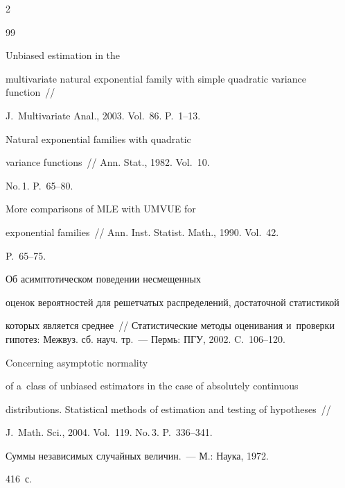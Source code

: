 \begin{multicols}{2}
{{\begin{thebibliography}{99}




 Unbiased estimation in the


  multivariate natural exponential family with simple quadratic variance function~// 


  J.~Multivariate Anal., 2003. Vol.~86. P.~1--13.






 Natural exponential families with quadratic


 variance functions~// Ann. Stat., 1982. Vol.~10.


 No.\,1.  P.~65--80.






 More comparisons of MLE with UMVUE for


 exponential families~// Ann. Inst. Statist. Math., 1990. Vol.~42.


 P.~65--75.






 Об асимптотическом поведении несмещенных


  оценок вероятностей для решетчатых распределений, достаточной статистикой


  которых является среднее~// Статистические методы оценивания и~проверки гипотез: Межвуз. сб. науч. тр.~--- Пермь: ПГУ, 2002. C.~106--120.






 Concerning asymptotic normality


  of a~class of unbiased estimators in the case of absolutely continuous


  distributions. Statistical methods of estimation and testing of hypotheses~//


  J.~Math. Sci., 2004. Vol.~119. No.\,3. P.~336--341.













 Суммы независимых случайных величин.~--- М.: Наука, 1972.


416~с.






\end{thebibliography}}}
\end{multicols}
